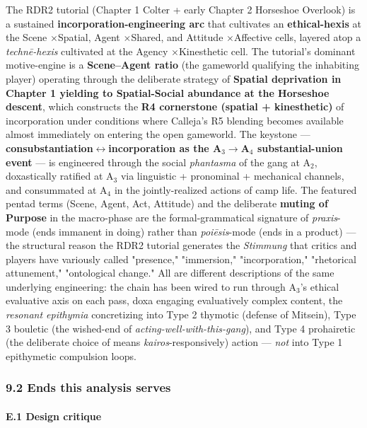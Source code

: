 \documentclass[11pt]{report}
\begin{document}
The RDR2 tutorial (Chapter 1 Colter + early Chapter 2 Horseshoe Overlook) is a sustained \textbf{incorporation-engineering arc} that cultivates an \textbf{ethical-hexis} at the Scene $\times$\allowbreak  Spatial, Agent $\times$\allowbreak  Shared, and Attitude $\times$\allowbreak  Affective cells, layered atop a \textit{technē-hexis} cultivated at the Agency $\times$\allowbreak  Kinesthetic cell. The tutorial's dominant motive-engine is a \textbf{Scene–Agent ratio} (the gameworld qualifying the inhabiting player) operating through the deliberate strategy of \textbf{Spatial deprivation in Chapter 1 yielding to Spatial-Social abundance at the Horseshoe descent}, which constructs the \textbf{R4 cornerstone (spatial + kinesthetic)} of incorporation under conditions where Calleja's R5 blending becomes available almost immediately on entering the open gameworld. The keystone — \textbf{consubstantiation$\leftrightarrow$\allowbreak incorporation as the A$_3$$\rightarrow$\allowbreak A$_4$ substantial-union event} — is engineered through the social \textit{phantasma} of the gang at A$_2$, doxastically ratified at A$_3$ via linguistic + pronominal + mechanical channels, and consummated at A$_4$ in the jointly-realized actions of camp life. The featured pentad terms (Scene, Agent, Act, Attitude) and the deliberate \textbf{muting of Purpose} in the macro-phase are the formal-grammatical signature of \textit{praxis}-mode (ends immanent in doing) rather than \textit{poiēsis}-mode (ends in a product) — the structural reason the RDR2 tutorial generates the \textit{Stimmung} that critics and players have variously called "presence," "immersion," "incorporation," "rhetorical attunement," "ontological change." All are different descriptions of the same underlying engineering: the chain has been wired to run through A$_3$'s ethical evaluative axis on each pass, doxa engaging evaluatively complex content, the \textit{resonant epithymia} concretizing into Type 2 thymotic (defense of Mitsein), Type 3 bouletic (the wished-end of \textit{acting-well-with-this-gang}), and Type 4 prohairetic (the deliberate choice of means \textit{kairos}-responsively) action — \textit{not} into Type 1 epithymetic compulsion loops.


\subsubsection{9.2 Ends this analysis serves}


\paragraph{E.1 Design critique}
\end{document}
